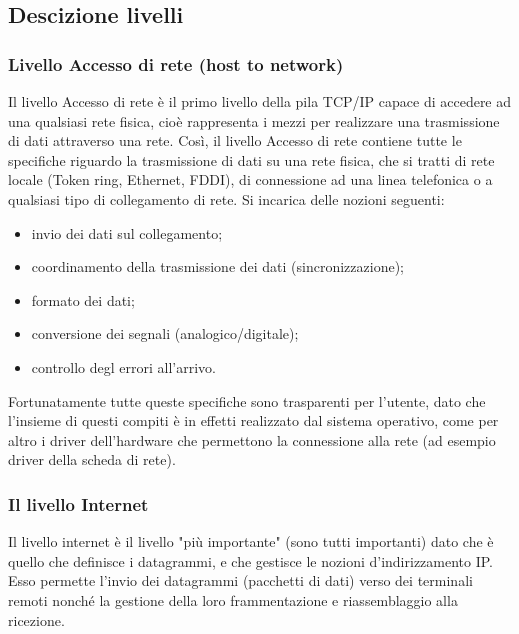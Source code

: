 \documentclass[12pt, a4paper, oneside]{book}
\begin{document}
\subsection{Descizione livelli} 
\subsubsection{Livello Accesso di rete (host to network)}
Il livello Accesso di rete è il primo livello della pila TCP/IP capace di accedere ad una qualsiasi rete fisica, cioè rappresenta i mezzi per realizzare una trasmissione di dati attraverso una rete. Così, il livello Accesso di rete contiene tutte le specifiche riguardo la trasmissione di dati su una rete fisica, che si tratti di rete locale (Token ring, Ethernet, FDDI), di connessione ad una linea telefonica o a qualsiasi tipo di collegamento di rete. Si incarica delle nozioni seguenti: 
\begin{itemize}
	\item invio dei dati sul collegamento; 
	\item coordinamento della trasmissione dei dati (sincronizzazione); 
	\item formato dei dati; 
	\item conversione dei segnali (analogico/digitale); 
	\item controllo degl errori all'arrivo.
\end{itemize}
Fortunatamente tutte queste specifiche sono trasparenti per l'utente, dato che l'insieme di questi compiti è in effetti realizzato dal sistema operativo, come per altro i driver dell'hardware che permettono la connessione alla rete (ad esempio driver della scheda di rete).
\subsubsection{Il livello Internet}
Il livello internet è il livello "più importante" (sono tutti importanti) dato che è quello che definisce i datagrammi, e che gestisce le nozioni d'indirizzamento IP. Esso permette l'invio dei datagrammi (pacchetti di dati) verso dei terminali remoti nonché la gestione della loro frammentazione e riassemblaggio alla ricezione. 
\end{document}

